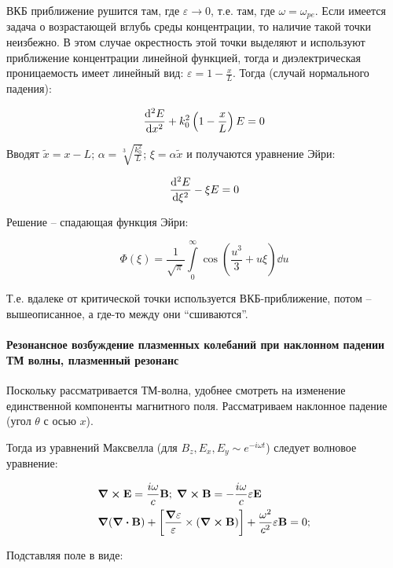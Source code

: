 \documentclass[10pt, a4paper]{article}
\begin{document}
ВКБ приближение рушится там, где $\varepsilon\rightarrow 0$, т.е. там, где $\omega=\omega_{pe}$. Если имеется задача о возрастающей вглубь среды концентрации, то наличие такой точки неизбежно. В этом случае окрестность этой точки выделяют и используют приближение концентрации линейной функцией, тогда и диэлектрическая проницаемость имеет линейный вид: $\varepsilon = 1-\frac{x}{L}$. Тогда (случай нормального падения):

\begin{equation*}
	\dv[2]{E}{x}+k_0^2\left(1-\frac{x}{L}\right)E = 0
\end{equation*}

Вводят $\tilde{x} = x-L$; $\alpha = \sqrt[3]{\frac{k_0^2}{L}}$; $\xi = \alpha\tilde{x}$ и получаются уравнение Эйри:

\begin{equation*}
	\dv[2]{E}{\xi}-\xi E = 0
\end{equation*}

Решение -- спадающая функция Эйри:

\begin{equation*}
	\varPhi(\xi) = \frac{1}{\sqrt{\pi}}\int\limits_0^\infty\cos\left(\frac{u^3}{3}+u\xi\right)\dd{u} 
\end{equation*}

Т.е. вдалеке от критической точки используется ВКБ-приближение, потом -- вышеописанное, а где-то между они ``сшиваются''. 

\paragraph{Резонансное возбуждение плазменных колебаний при наклонном падении ТМ волны, плазменный резонанс}

Поскольку рассматривается ТМ-волна, удобнее смотреть на изменение единственной компоненты магнитного поля. Рассматриваем наклонное падение (угол $\theta$ с осью $x$).

Тогда из уравнений Максвелла (для $B_z, E_x, E_y\sim e^{-i\omega t}$) следует волновое уравнение:

\begin{align*}
	&\curl{\vb{E}} = \frac{i\omega}{c}\vb{B};\;\curl{\vb{B}} = -\frac{i\omega}{c}\vb{\varepsilon\vb{E}}\\
	&\grad{(\div{\vb{B}})} + \left[\frac{\grad{\varepsilon}}{\varepsilon}\times(\curl{\vb{B}})\right] + \frac{\omega^2}{c^2}\varepsilon\vb{B} = 0;	
\end{align*}
 
Подставляя поле в виде:
 
\end{document}
